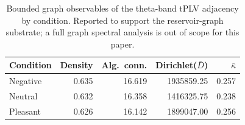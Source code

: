 \begin{table}[t]\centering
\caption{Bounded graph observables of the theta-band tPLV adjacency by condition. Reported to support the reservoir-graph substrate; a full graph spectral analysis is out of scope for this paper.}
\label{tab:graph_support}
\begin{tabular}{lrrrr}
\toprule
Condition & Density & Alg.\ conn. & Dirichlet($\bar D$) & $\bar\kappa$ \\
\midrule
Negative & 0.635 & 16.619 & 1935859.25 & 0.257 \\
Neutral & 0.632 & 16.358 & 1416325.75 & 0.238 \\
Pleasant & 0.626 & 16.142 & 1899047.00 & 0.256 \\
\bottomrule
\end{tabular}
\end{table}
